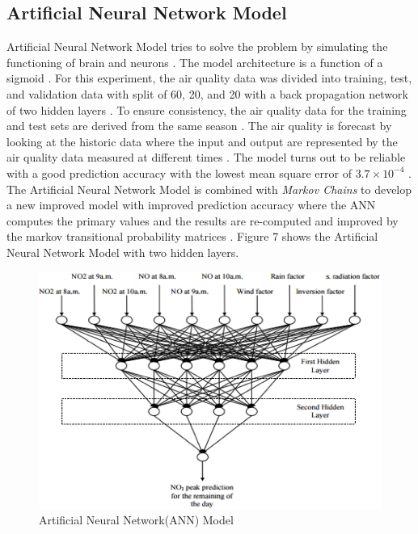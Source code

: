 \documentclass[sigconf]{acmart}
\begin{document}
\subsection{Artificial Neural Network Model}
Artificial Neural Network Model tries to solve the problem by simulating the functioning of brain and neurons \cite{gagan2017}. The model architecture is a function of a sigmoid \cite{gagan2017}. For this experiment, the air quality data was divided into training, test, and validation data with  split of 60, 20, and 20 with a back propagation network of two hidden layers \cite{gagan2017}. To ensure consistency, the air quality data for the training and test sets are derived from the same season \cite{gagan2017}. The air quality is forecast by looking at the historic data where the input and output are represented by the air quality data measured at different times \cite{gagan2017}. The model turns out to be reliable with a good prediction accuracy with the lowest mean square error of $3.7 \times 10^{-4}$ \cite{gagan2017}. The Artificial Neural Network Model is combined with {\em Markov Chains} to develop a new improved model with improved prediction accuracy where the ANN computes the primary values and the results are re-computed and improved by the markov transitional probability matrices \cite{gagan2017}. Figure 7 shows the Artificial Neural Network Model with two hidden layers. 

\begin{figure}
\includegraphics[width=1.0\textwidth]{images/fig7.png}
\caption{Artificial Neural Network(ANN) Model \cite{gagan2017}}
\end{figure}
\end{document}
